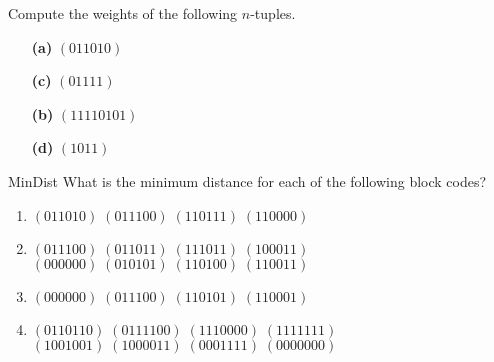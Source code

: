 \begin{exercise}{}
Compute the weights of the following $n$-tuples.
 
\vspace{3pt}        %
 
\hspace{-7pt}
\begin{minipage}[t]{4.6in}
\noindent
\begin{minipage}[t]{2.25in}
\begin{itemize}
 
 \item[{\bf (a)}]
$(011010)$
 
 \item[{\bf (c)}]
$(01111)$
 
\end{itemize}
\end{minipage} \hfill
\begin{minipage}[t]{2.25in}
\begin{itemize}
 
 \item[{\bf (b)}]
$(11110101)$
 
 \item[{\bf (d)}]
$(1011)$
 
\end{itemize}
\end{minipage}
\end{minipage}
 
\end{exercise} 

\begin{exercise}{MinDist}
What is the minimum distance for each of the following 
block codes? 
\begin{enumerate}
 
 \bf\item\rm
$(011010) \; (011100) \; (110111) \; (110000)$
 
 \bf\item\rm
$(011100) \; (011011) \; (111011) \; (100011)$ \\
$(000000) \; (010101) \; (110100) \; (110011)$
 
 \bf\item\rm
$(000000) \; (011100) \; (110101) \; (110001)$
 
 \bf\item\rm
$(0110110) \; (0111100) \; (1110000) \; (1111111)$ \\
$(1001001) \; (1000011) \; (0001111) \; (0000000)$
 
\end{enumerate}
 \end{exercise}
 
